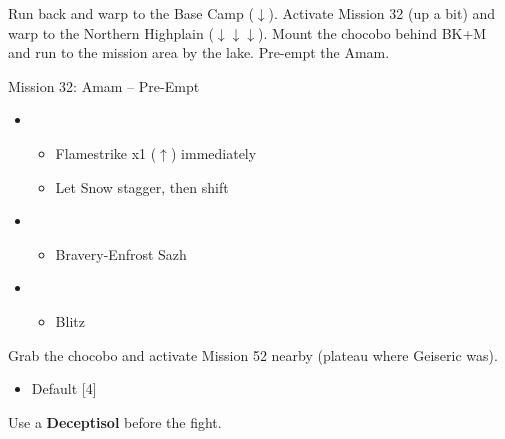 Run back and warp to the Base Camp ($\downarrow$).
Activate Mission 32 (up a bit) and warp to the Northern Highplain ($\downarrow\downarrow\downarrow$).
Mount the chocobo behind BK+M and run to the mission area by the lake.
Pre-empt the Amam.

\begin{battle}{Mission 32: Amam -- Pre-Empt}
	\begin{itemize}
		\item \sixth
			\begin{itemize}
				\item Flamestrike x1 ($\uparrow$) immediately
				\item Let Snow stagger, then shift
			\end{itemize}
		\item \fifth
			\begin{itemize}
				\item Bravery-Enfrost Sazh
			\end{itemize}
		\item \first
			\begin{itemize}
				\item Blitz
			\end{itemize}
	\end{itemize}
\end{battle}

Grab the chocobo and activate Mission 52 nearby (plateau where Geiseric was).

\begin{menu}
	\begin{itemize}
	\paradigm
		\begin{itemize}
			\item Default [4]
		\end{itemize}
	\end{itemize}
\end{menu}

Use a \textbf{Deceptisol} before the fight.

